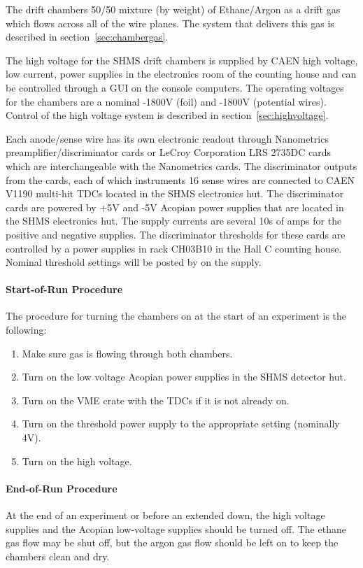 {The drift chambers 50/50 mixture (by weight) of Ethane/Argon as a
drift gas which
flows across all of the wire planes.  The system that delivers this
gas is described in section~\ref{sec:chambergas}.

The high voltage for the SHMS drift chambers is supplied by CAEN
high voltage, low current, power supplies in the electronics room of
the counting
house and can be controlled through a GUI on the console computers.
The operating voltages for the chambers are a nominal -1800V (foil) and -1800V
(potential wires).  Control of the high voltage system is described in
section~\ref{sec:highvoltage}.

Each anode/sense wire has its own electronic readout through
Nanometrics preamplifier/discriminator cards or LeCroy Corporation LRS
2735DC cards which are interchangeable with the Nanometrics cards.
The discriminator outputs from the cards, each of which instruments 16
sense wires are connected to CAEN V1190 multi-hit TDCs located in the
SHMS electronics hut.
The discriminator cards are powered by +5V and -5V Acopian power
supplies that are
located in the SHMS electronics hut.  The supply currents are several
10s of amps for the positive and negative supplies.
The discriminator thresholds for these cards are controlled by a power
supplies in rack CH03B10 in the Hall C counting house.  Nominal
threshold settings will be posted by on the supply.

\paragraph{Start-of-Run Procedure}
The procedure for turning the chambers on at the start of an
experiment is the following:
\begin{enumerate}
\item Make sure gas is flowing through both chambers.
\item Turn on the low voltage Acopian power supplies in the SHMS detector hut.
\item Turn on the VME crate with the TDCs if it is not already on.
\item Turn on the threshold power supply to the appropriate setting
  (nominally 4V).
\item Turn on the high voltage.
\end{enumerate}

\paragraph{End-of-Run Procedure}
At the end of an experiment or before an extended down, the high
voltage supplies and the Acopian low-voltage supplies should be turned
off.  The ethane gas flow may be shut off, but the argon gas flow
should be left on to keep the chambers clean and dry.

}%
